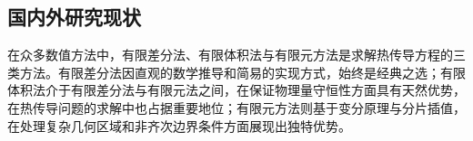 \documentclass{GZUbachelorthesis}
\theoremstyle{chineseplain}
\begin{document}
\subsection{国内外研究现状}
在众多数值方法中，有限差分法、有限体积法与有限元方法是求解热传导方程的三类方法。有限差分法因直观的数学推导和简易的实现方式，始终是经典之选\cite{loskor2022numerical}；有限体积法介于有限差分法与有限元法之间，在保证物理量守恒性方面具有天然优势，在热传导问题的求解中也占据重要地位；有限元方法则基于变分原理与分片插值，在处理复杂几何区域和非齐次边界条件方面展现出独特优势\cite{chen2010finite}。
\end{document}
